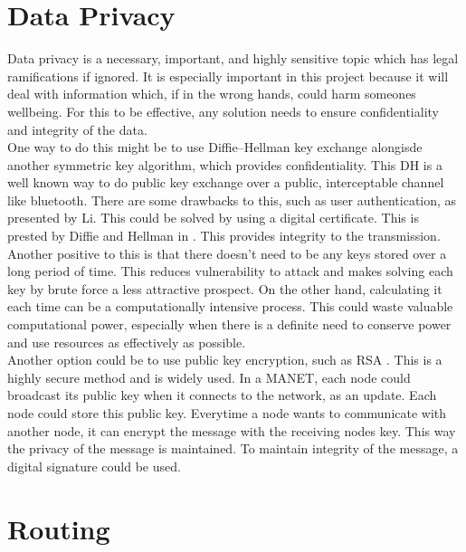 \documentclass{report}
\begin{document}
\section*{Data Privacy}

Data privacy is a necessary, important, and highly sensitive topic which has legal ramifications if ignored. It is especially important in this project because it will 
deal with information which, if in the wrong hands, could harm someones wellbeing. For this to be effective, any solution needs to ensure confidentiality and integrity of the data.
\bigskip\\
One way to do this might be to use Diffie--Hellman key exchange\cite{li2010research} \cite{diffie1976new} alongisde another symmetric key algorithm, which provides confidentiality. This DH is a well known way to do public key exchange over 
a public, interceptable channel like bluetooth. There are some drawbacks to this, such as user authentication, as presented by Li. This could be solved by using a digital 
certificate. This is prested by Diffie and Hellman in \cite{diffie1976new}. This provides integrity to the transmission. Another positive to this is that there doesn't need to be any keys stored over a long period of time. This reduces vulnerability to attack and makes solving 
each key by brute force a less attractive prospect. On the other hand, calculating it each time can be a computationally intensive process. This could waste valuable 
computational power, especially when there is a definite need to conserve power and use resources as effectively as possible. 
\bigskip\\
Another option could be to use public key encryption, such as RSA \cite{aufa2018security}. This is a highly secure method and is widely used. In a MANET, each node could 
broadcast its public key when it connects to the network, as an update. Each node could store this public key. Everytime a node wants to communicate with another node, it can 
encrypt the message with the receiving nodes key. This way the privacy of the message is maintained. To maintain integrity of the message, a digital signature could be 
used. 

\section*{Routing}
\end{document}
